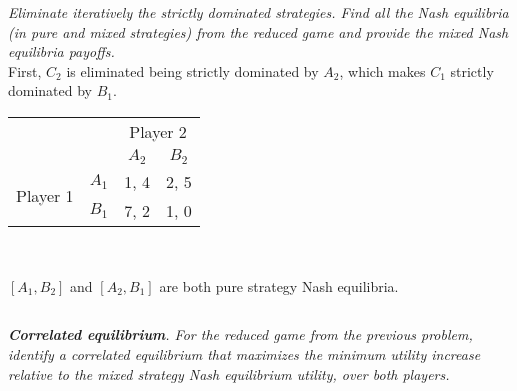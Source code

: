 \documentclass[12pt]{amsart}
\begin{document}
\textit{Eliminate iteratively the strictly dominated strategies. Find all the Nash equilibria (in pure
	and mixed strategies) from the reduced game and provide the mixed Nash equilibria
	payoffs.} \\
	
	First, $C_2$ is eliminated being strictly dominated by $A_2$,
	which makes $C_1$ strictly dominated by $B_1$.

	\begin{center}
		\def\arraystretch{1.25}%
		\begin{tabular}{cccc}
			&                            & \multicolumn{2}{c}{Player 2}                            \\
			& \multicolumn{1}{c|}{}      & \multicolumn{1}{c|}{$A_2$} & \multicolumn{1}{c|}{$B_2$} \\ \cline{2-4} 
			\multirow{2}{*}{Player 1} & \multicolumn{1}{c|}{$A_1$} & \multicolumn{1}{c|}{1, 4}  & \multicolumn{1}{c|}{2, 5}  \\ \cline{2-4} 
			& \multicolumn{1}{c|}{$B_1$} & \multicolumn{1}{c|}{7, 2}  & \multicolumn{1}{c|}{1, 0}  \\ \cline{2-4} 
		\end{tabular} \\[1ex]
	\end{center}
	
	$[A_1,B_2]$ and $[A_2,B_1]$ are both pure strategy Nash equilibria.
	
	

\subsection{}
\textit{\textbf{Correlated equilibrium}. For the reduced game from the previous problem, identify a
	correlated equilibrium that maximizes the minimum utility increase relative to the mixed strategy Nash equilibrium utility, over both players.}
\end{document}
